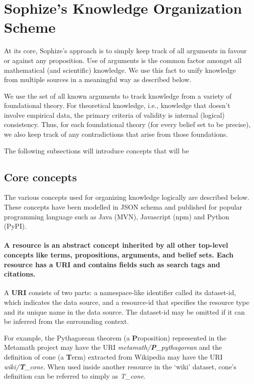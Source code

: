 \documentclass[a4paper]{article}
\begin{document}
\section{Sophize's Knowledge Organization Scheme}
At its core, Sophize's approach is to simply keep track of all arguments in favour or against any proposition. Use of arguments is the common factor amongst all mathematical (and scientific) knowledge. We use this fact to unify knowledge from multiple sources in a meaningful way as described below.

We use the set of all known arguments to track knowledge from a variety of foundational theory. For theoretical knowledge, i.e., knowledge that doesn't involve empirical data, the primary criteria of validity is internal (logical) consistency. Thus, for each foundational theory (for every belief set to be precise), we also keep track of any contradictions that arise from those foundations.

The following subsections will introduce concepts that will be 

\subsection{Core concepts}
The various concepts used for organizing knowledge logically are described below. These concepts have been modelled in JSON schema \cite{sophize_datamodel} and published for popular programming language such as Java (MVN), Javascript (npm) and Python (PyPI). 

\paragraph{A \textbf{resource} is an abstract concept inherited by all other top-level concepts like terms, propositions, arguments, and belief sets. Each resource has a URI and contains fields such as search tags and citations.}

A \textbf{URI} consists of two parts: a namespace-like identifier called its dataset-id, which indicates the data source, and a resource-id that specifies the resource type and its unique name in the data source. The dataset-id may be omitted if it can be inferred from the surrounding context.

For example, the Pythagorean theorem (a \textbf{P}roposition) represented in the Metamath project may have the URI \emph{metamath/\textbf{P}\_pythagorean} and the definition of cone (a \textbf{T}erm) extracted from Wikipedia may have the URI \emph{wiki/\textbf{T}\_cone}. When used inside another resource in the `wiki' dataset, cone's definition can be referred to simply as \emph{T\_cone}.
\end{document}
